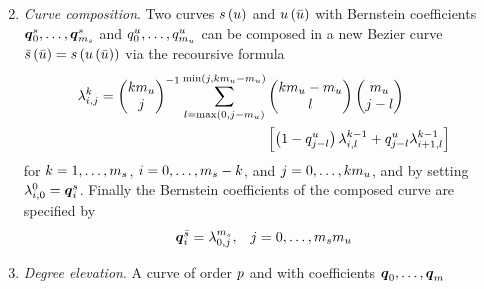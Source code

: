 \begin{enumerate}
\begin{equation*}
    \end{equation*}
    \item \emph{Curve composition}. Two curves $s \left( u \right)$ and $u \left( \bar{u} \right)$ with Bernstein
    coefficients $\boldsymbol{q}^{s}_{0}, \dots, \boldsymbol{q}^{s}_{m_{s}}$
    and $q^{u}_{0}, \dots, q^{u}_{m_{u}}$ can be composed in a new B\acuteacc ezier curve
    $\bar{s} \left( \bar{u} \right) = s \left( u \left( \bar{u} \right) \right)$ via the recoursive formula
    \begin{equation*}
        \begin{split}
            \lambda_{i,j}^k =
            \begin{pmatrix}
                k m_{u} \\ j
            \end{pmatrix}^{-1}
            \sum_{l = \max \left( 0, j - m_{u} \right)}^{\min \left( j, k m_{u} - m_{u} \right)} &
            \begin{pmatrix}
                k m_{u} - m_u \\ l
            \end{pmatrix}
            \begin{pmatrix}
                m_{u} \\ j-l
            \end{pmatrix} \\
            & \left[ \left( 1-q^{u}_{j-l} \right) \lambda_{i,l}^{k-1} + q^{u}_{j-l}\lambda_{i+1,l}^{k-1} \right]
        \end{split}
    \end{equation*}
    for $k = 1, \dots, m_{s}$, $i = 0, \dots, m_{s}-k$, and $j = 0, \dots, k m_{u}$,
    and by setting $\lambda^0_{i,0} = \boldsymbol{q}^{s}_i$. Finally the Bernstein coefficients of the composed curve are specified by
    \begin{equation*}
        \begin{matrix}
            \boldsymbol{q}^{\bar{s}}_i = \lambda_{0,j}^{m_{s}}, & j = 0, \dots, m_{s}m_{u}
        \end{matrix}
    \end{equation*}
    \item \emph{Degree elevation}. A curve of order $p$ and with coefficients $\boldsymbol{q}_0, \dots, \boldsymbol{q}_{m}$

\end{enumerate}
